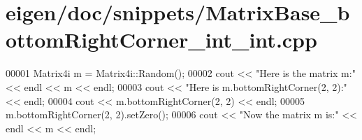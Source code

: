 \hypertarget{eigen_2doc_2snippets_2_matrix_base__bottom_right_corner__int__int_8cpp_source}{}\section{eigen/doc/snippets/\+Matrix\+Base\+\_\+bottom\+Right\+Corner\+\_\+int\+\_\+int.cpp}
\label{eigen_2doc_2snippets_2_matrix_base__bottom_right_corner__int__int_8cpp_source}

\begin{DoxyCode}
00001 Matrix4i m = Matrix4i::Random();
00002 cout << \textcolor{stringliteral}{"Here is the matrix m:"} << endl << m << endl;
00003 cout << \textcolor{stringliteral}{"Here is m.bottomRightCorner(2, 2):"} << endl;
00004 cout << m.bottomRightCorner(2, 2) << endl;
00005 m.bottomRightCorner(2, 2).setZero();
00006 cout << \textcolor{stringliteral}{"Now the matrix m is:"} << endl << m << endl;
\end{DoxyCode}
